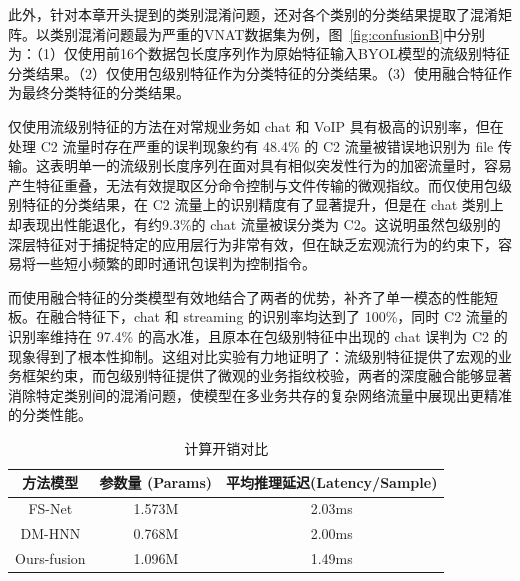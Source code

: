 此外，针对本章开头提到的类别混淆问题，还对各个类别的分类结果提取了混淆矩阵。以类别混淆问题最为严重的VNAT数据集为例，图~\ref{fig:confusionB}中分别为：（1）仅使用前16个数据包长度序列作为原始特征输入BYOL模型的流级别特征分类结果。（2）仅使用包级别特征作为分类特征的分类结果。（3）使用融合特征作为最终分类特征的分类结果。

仅使用流级别特征的方法在对常规业务如 chat 和 VoIP 具有极高的识别率，但在处理 C2 流量时存在严重的误判现象约有 48.4\% 的 C2 流量被错误地识别为 file 传输。这表明单一的流级别长度序列在面对具有相似突发性行为的加密流量时，容易产生特征重叠，无法有效提取区分命令控制与文件传输的微观指纹。而仅使用包级别特征的分类结果，在 C2 流量上的识别精度有了显著提升，但是在 chat 类别上却表现出性能退化，有约9.3\%的 chat 流量被误分类为 C2。这说明虽然包级别的深层特征对于捕捉特定的应用层行为非常有效，但在缺乏宏观流行为的约束下，容易将一些短小频繁的即时通讯包误判为控制指令。

而使用融合特征的分类模型有效地结合了两者的优势，补齐了单一模态的性能短板。在融合特征下，chat 和 streaming 的识别率均达到了 100\%，同时 C2 流量的识别率维持在 97.4\% 的高水准，且原本在包级别特征中出现的 chat 误判为 C2 的现象得到了根本性抑制。这组对比实验有力地证明了：流级别特征提供了宏观的业务框架约束，而包级别特征提供了微观的业务指纹校验，两者的深度融合能够显著消除特定类别间的混淆问题，使模型在多业务共存的复杂网络流量中展现出更精准的分类性能。

\begin{table}[htbp]
\centering
\renewcommand{\arraystretch}{1.3}
\caption{计算开销对比}
\label{tab:computational}
\begin{tabular}{ccc}
\toprule
\textbf{方法模型} & \textbf{参数量 (Params)} & \textbf{平均推理延迟(Latency/Sample)} \\ 
\midrule
FS-Net & 1.573M & 2.03ms \\ 
DM-HNN & 0.768M & 2.00ms \\
Ours-fusion & 1.096M & 1.49ms \\
\bottomrule
\end{tabular}
\end{table}


